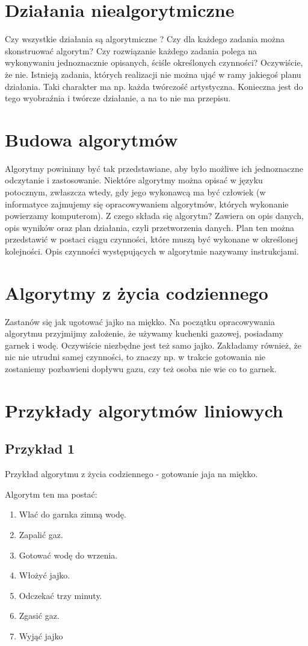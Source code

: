 \documentclass[a4paper,11pt]{article}
\begin{document}
\section{Działania niealgorytmiczne} 
Czy wszystkie działania są algorytmiczne ? Czy dla każdego zadania można 
skonstruować algorytm? Czy rozwiązanie każdego zadania polega na wykonywaniu 
jednoznacznie opisanych, ściśle określonych czynności? 
Oczywiście, że nie. Istnieją zadania, których realizacji nie można ująć w ramy jakiegoś 
planu działania. Taki charakter ma np. każda twórczość artystyczna. Konieczna jest 
do tego wyobraźnia i twórcze działanie, a na to nie ma przepisu. 
\section{Budowa algorytmów} 
Algorytmy powininny być tak przedstawiane, aby było możliwe ich jednoznaczne 
odczytanie i zastosowanie. Niektóre algorytmy można opisać w języku potocznym, 
zwłaszcza wtedy, gdy jego wykonawcą ma być człowiek (w informatyce zajmujemy 
się opracowywaniem algorytmów, których wykonanie powierzamy komputerom). 
Z czego składa się algorytm? 
Zawiera on opis danych, opis wyników oraz plan działania, czyli przetworzenia 
danych. Plan ten można przedstawić w postaci ciągu czynności, które muszą być 
wykonane w określonej kolejności. Opis czynności występujących w algorytmie 
nazywamy instrukcjami. 
\section{Algorytmy z życia codziennego} 
Zastanów się jak ugotować jajko na miękko. Na początku opracowywania algorytmu 
przyjmijmy założenie, że używamy kuchenki gazowej, posiadamy garnek i wodę. 
Oczywiście niezbędne jest też samo jajko. Zakładamy również, że nic nie utrudni samej 
czynności, to znaczy np. w trakcie gotowania nie zostaniemy pozbawieni dopływu 
gazu, czy też osoba nie wie co to garnek. 
\section{Przykłady algorytmów liniowych}
\subsection{Przykład 1} 
Przykład algorytmu z życia codziennego - gotowanie jaja na miękko. 
 
Algorytm ten ma postać: 
\begin{enumerate}
\item Wlać do garnka zimną wodę. 
\item Zapalić gaz. 
\item Gotować wodę do wrzenia. 
\item Włożyć jajko. 
\item Odczekać trzy minuty. 
\item Zgasić gaz. 
\item Wyjąć jajko
\end{enumerate}
\newpage
\end{document}
